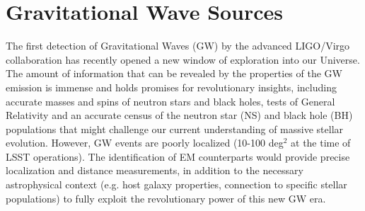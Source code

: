 %
%
%
%
%
%
%

\section{Gravitational Wave Sources}
\def\secname{gw}\label{sec:\secname}



The first detection of Gravitational Waves (GW) by the advanced LIGO/Virgo collaboration \citep{Abbott16, Abbott09, Acernese08} has recently opened a new window of exploration into our Universe. The amount of information that can be revealed by the properties of the GW emission is immense and holds promises for revolutionary insights, including accurate masses and spins of neutron stars and black holes, tests of General Relativity and an accurate census of the neutron star (NS) and black hole (BH) populations that might challenge our current understanding of massive stellar evolution. However, GW events are poorly localized (10-100 deg$^2$ at the time of LSST operations). The identification of EM counterparts would provide precise localization and distance measurements, in addition to the necessary astrophysical context (e.g. host galaxy properties, connection to specific stellar populations) to fully exploit the revolutionary power of this new GW era.


